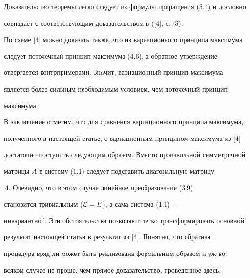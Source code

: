 Доказательство теоремы легко следует из формулы приращения (5.4) и дословно


совпадает с соответствующим доказательством в ([4], с.\,75).





По схеме [4] можно доказать также, что из вариационного принципа максимума


следует поточечный принцип максимума (4.6), а обратное утверждение


отвергается контрпримерами. Знaчит, вариационный принцип максимума


является более сильным необходимым условием, чем поточечный принцип


максимума.





В заключение отметим, что для сравнения вариационного принципа максимума,


полученного в настоящей статье, с вариационным принципом максимума из [4]


достаточно поступить следующим образом. Вместо произвольной симметричной


матрицы $A$ в систему (1.1) следует подставить диагональную матрицу


$\Lambda$. Очевидно, что в этом случае линейное преобразование (3.9)


становится тривиальным (${\cal L} = E$), а сама система (1.1) ---


инвариантной. Эти обстоятельства позволяют легко трансформировать основной


результат настоящей статьи в результат из [4]. Понятно, что обратная


процедура вряд ли может быть реализована формальным образом и уж во


всяком случае не проще, чем прямое доказательство, проведенное здесь.





